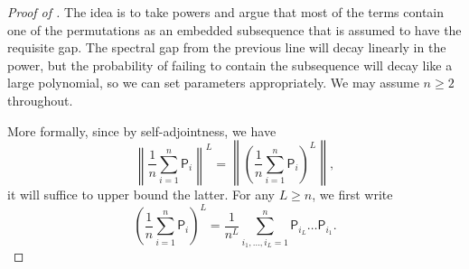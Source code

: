 \documentclass[11pt]{article}
\begin{document}
\begin{proof}[Proof of ]
    The idea is to take powers and argue that most of the terms contain one of the permutations as an embedded subsequence that is assumed to have the requisite gap. The spectral gap from the previous line will decay linearly in the power, but the probability of failing to contain the subsequence will decay like a large polynomial, so we can set parameters appropriately. We may assume $n\geq 2$ throughout.

    More formally, since by self-adjointness, we have
    \begin{equation*}
        \left\|\frac{1}{n}\sum_{i=1}^n \mathsf{P}_i\right\|^L =\left\|\left(\frac{1}{n}\sum_{i=1}^n \mathsf{P}_i\right)^L\right\| ,
    \end{equation*}
    it will suffice to upper bound the latter. For any $L\geq n$, we first write
    \begin{equation*}
        \left(\frac{1}{n}\sum_{i=1}^n \mathsf{P}_i \right)^L = \frac{1}{n^L}\sum_{i_1,\ldots,i_L=1}^n \mathsf{P}_{i_L}\ldots \mathsf{P}_{i_1}.
    \end{equation*}


\end{proof}
\end{document}
